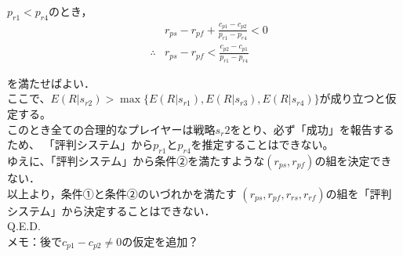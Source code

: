 $p_{r1} < p_{r4}$のとき， 
\begin{eqnarray}
  &&r_{ps} - r_{pf} + \frac{ c_{p1} - c_{p2} }{p_{r1} - p_{r4}} < 0 \nonumber \\
  &\therefore&r_{ps} - r_{pf} < \frac{ c_{p2} - c_{p1} }{ p_{r1} - p_{r4} } \nonumber
\end{eqnarray}

を満たせばよい．\\

ここで、$E(R|s_{r2})>\max\{E(R|s_{r1}), E(R|s_{r3}), E(R|s_{r4}) \}$が成り立つと仮定する。\\

このとき全ての合理的なプレイヤーは戦略$s_r2$をとり、必ず「成功」を報告するため、
「評判システム」から$p_{r1}$と$p_{r4}$を推定することはできない。\\

ゆえに、「評判システム」から条件②を満たすような$(r_{ps}, r_{pf})$の組を決定できない．\\

以上より，条件①と条件②のいづれかを満たす
$(r_{ps}, r_{pf},r_{rs},r_{rf})$の組を「評判システム」から決定することはできない．\\

Q.E.D. \\


メモ：後で$c_{p1} - c_{p2} \neq 0$の仮定を追加？

